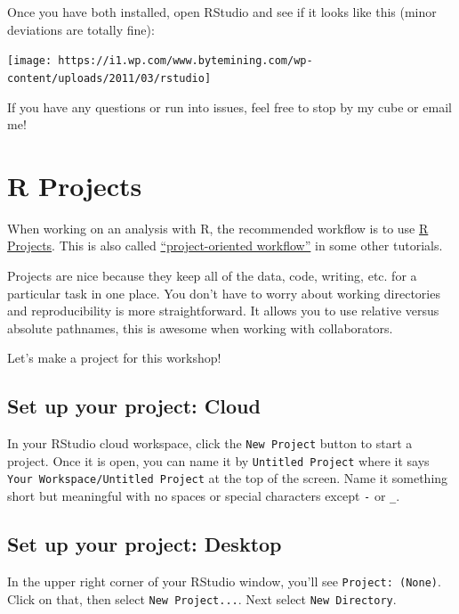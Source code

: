 \documentclass[]{book}
\begin{document}
Once you have both installed, open RStudio and see if it looks like this
(minor deviations are totally fine):

\texttt{[image: https://i1.wp.com/www.bytemining.com/wp-content/uploads/2011/03/rstudio]}

If you have any questions or run into issues, feel free to stop by my
cube or email me!

\chapter{R Projects}\label{r-projects}

When working on an analysis with R, the recommended workflow is to use
\href{https://r4ds.had.co.nz/workflow-projects.html}{R Projects}. This
is also called
\href{https://www.tidyverse.org/articles/2017/12/workflow-vs-script/}{``project-oriented
workflow''} in some other tutorials.

Projects are nice because they keep all of the data, code, writing, etc.
for a particular task in one place. You don't have to worry about
working directories and reproducibility is more straightforward. It
allows you to use relative versus absolute pathnames, this is awesome
when working with collaborators.

Let's make a project for this workshop!

\section{Set up your project: Cloud}\label{set-up-your-project-cloud}

In your RStudio cloud workspace, click the \texttt{New\ Project} button
to start a project. Once it is open, you can name it by
\texttt{Untitled\ Project} where it says
\texttt{Your\ Workspace/Untitled\ Project} at the top of the screen.
Name it something short but meaningful with no spaces or special
characters except \texttt{-} or \texttt{\_}.

\section{Set up your project:
Desktop}\label{set-up-your-project-desktop}

In the upper right corner of your RStudio window, you'll see
\texttt{Project:\ (None)}. Click on that, then select
\texttt{New\ Project...}. Next select \texttt{New\ Directory}.
\end{document}
